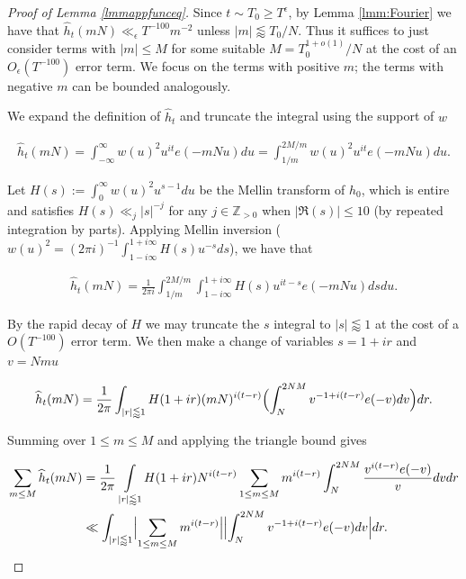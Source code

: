 \documentclass{amsart}
\theoremstyle{plain}
\numberwithin{equation}{section}
\begin{document}
\begin{proof}[Proof of Lemma \ref{lmmappfunceq}]
Since $t\sim T_0\ge T^\epsilon$, by Lemma \ref{lmm:Fourier} we have that $\widehat{h}_t(mN)\ll_\epsilon T^{-100}m^{-2}$ unless $|m|\lessapprox T_0/N$. Thus it suffices to just consider terms with $|m|\le M$ for some suitable $M=T_0^{1+o(1)}/N$ at the cost of an $O_\epsilon(T^{-100})$ error term. We focus on the terms with positive $m$; the terms with negative $m$ can be bounded analogously.

We expand the definition of $\widehat{h}_t$ and truncate the integral using the support of $w$ 

 \begin{align*}
\widehat{h}_t(mN)=\int_{-\infty}^\infty w(u)^2 u^{it}e(- mN u) du
=\int_{1/m}^{2M/m} w(u)^2 u^{it}e(-mN u) du.
\end{align*}

Let $H(s):=\int_{0}^\infty w(u)^2 u^{s-1}du$ be the Mellin transform of $h_0$, which is entire and satisfies $H(s)\ll_j |s|^{-j}$ for any $j\in \mathbb{Z}_{>0}$  when $|\Re(s)|\le 10$ (by repeated integration by parts). Applying Mellin inversion  ($w(u)^2=(2\pi i)^{-1}\int_{1-i\infty}^{1+i\infty} H(s)u^{-s}ds$), we have that

 \begin{align*}
\widehat{h}_t(mN)=\frac{1}{2\pi i}\int_{1/m}^{2M/m}\int_{1-i\infty}^{1+i\infty}H(s)u^{it-s}e(- mN u) ds du.
\end{align*}

By the rapid decay of $H$ we may truncate the $s$ integral to $|s|\lessapprox 1$ at the cost of a $O(T^{-100})$ error term. We then make a change of variables $s=1+ir$ and $v=Nmu$

 \begin{align*}
\widehat{h}_t(mN)=\frac{1}{2\pi}\int_{|r|\lessapprox 1}H(1+ir)(mN)^{i(t-r)}\Bigl(\int_{N}^{2NM}v^{-1+i(t-r)}e(-v) dv\Bigr) dr.
\end{align*}

Summing over $1\le m\le  M$ and applying the triangle bound gives

 \begin{align*}
\sum_{\substack{m\le  M}}\widehat{h}_t(mN)&=\frac{1}{2\pi}\mathop{\int}_{|r|\lessapprox 1}H(1+ir)N^{i(t-r)}\sum_{\substack{1\le m\le M}}m^{i(t-r)}\int_{N}^{2NM}\frac{v^{i(t-r)}e(-v) }{v}dv dr\\
&\ll \int_{|r|\lessapprox 1}\Bigl|\sum_{1\le m\le M}m^{i(t-r)}\Bigr| \Bigl|\int_{N}^{2NM}v^{-1+i(t-r)}e(- v) dv\Bigr| dr.
\end{align*}


\end{proof}
\end{document}
